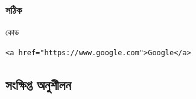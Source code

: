 \subsubsection{সঠিক}

\begin{examplebox}{কোড}
\par\noindent\begin{minipage}{\linewidth}
\begin{verbatim}
<a href="https://www.google.com">Google</a>
\end{verbatim}
\end{minipage}\par
\end{examplebox}

\subsection{সংক্ষিপ্ত অনুশীলন}

